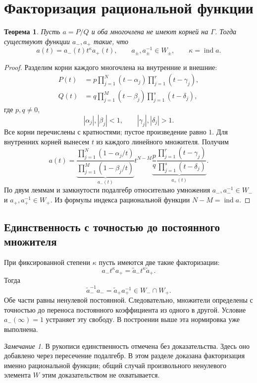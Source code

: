 \documentclass[12pt,a4paper]{article}
\newtheorem{theorem}{Теорема}
\theoremstyle{definition}
\theoremstyle{remark}
\newtheorem*{remark}{Замечание}
\DeclareMathOperator{\ind}{ind}
\begin{document}
\section{Факторизация рациональной функции}

\begin{theorem}
Пусть $a=P/Q$ и оба многочлена не имеют корней на $\Gamma$.
Тогда существуют функции $a_-,a_+$ такие, что
\[
  \boxed{a(t)=a_-(t)t^{\kappa}a_+(t)},\qquad
  a_\pm,a_\pm^{-1}\in W_\pm,\qquad \kappa=\ind a.
\]
\end{theorem}

\begin{proof}
Разделим корни каждого многочлена на внутренние и внешние:
\begin{align*}
  P(t)&=p\prod_{j=1}^{N}(t-\alpha_j)
          \prod_{j=1}^{r}(t-\gamma_j),\\
  Q(t)&=q\prod_{j=1}^{M}(t-\beta_j)
          \prod_{j=1}^{s}(t-\delta_j),
\end{align*}
где $p,q\ne0$,
\[
  |\alpha_j|,|\beta_j|<1,\qquad |\gamma_j|,|\delta_j|>1.
\]
Все корни перечислены с кратностями; пустое произведение равно $1$.
Для внутренних корней вынесем $t$ из каждого линейного множителя.
Получим
\[
  a(t)=
  \underbrace{\frac{\prod_{j=1}^{N}(1-\alpha_j/t)}
                    {\prod_{j=1}^{M}(1-\beta_j/t)}}_{a_-(t)}
  t^{N-M}
  \underbrace{\frac pq
       \frac{\prod_{j=1}^{r}(t-\gamma_j)}
            {\prod_{j=1}^{s}(t-\delta_j)}}_{a_+(t)}.
\]
По двум леммам и замкнутости подалгебр относительно умножения
$a_-,a_-^{-1}\in W_-$ и $a_+,a_+^{-1}\in W_+$.
Из формулы индекса рациональной функции $N-M=\ind a$.
\end{proof}

\subsection{Единственность с точностью до постоянного множителя}

При фиксированной степени $\kappa$ пусть имеются две такие факторизации:
\[
  a_-t^\kappa a_+=\widetilde a_-t^\kappa\widetilde a_+.
\]
Тогда
\[
  \widetilde a_-^{-1}a_-
  =\widetilde a_+a_+^{-1}\in W_-\cap W_+.
\]
Обе части равны ненулевой постоянной. Следовательно, множители
определены с точностью до переноса постоянного коэффициента из одного
в другой. Условие $a_-(\infty)=1$ устраняет эту свободу.
В построении выше эта нормировка уже выполнена.

\begin{remark}
В рукописи единственность отмечена без доказательства. Здесь оно
добавлено через пересечение подалгебр. В этом разделе доказана
факторизация именно рациональной функции; общий случай произвольного
ненулевого элемента $W$ этим доказательством не охватывается.
\end{remark}
\end{document}
